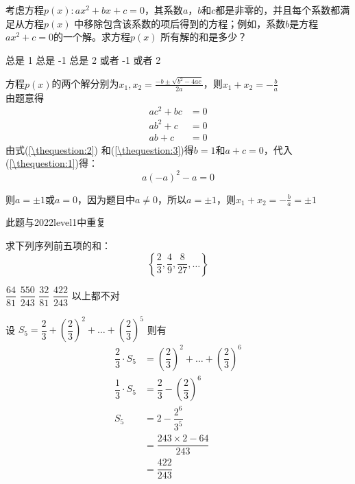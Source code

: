 \documentclass[answers]{exam}
\begin{document}
\begin{questions}
	\question 考虑方程$p(x): ax^2 + bx + c=0$，其系数$a$，$b$和$c$都是非零的，并且每个系数都满足从方程$p(x)$
	中移除包含该系数的项后得到的方程；例如，系数$b$是方程 $ax^2+c=0$的一个解。求方程$p(x)$
	所有解的和是多少？

	\begin{oneparchoices}
		\choice 总是 1 \choice 总是 -1 \choice 总是 2  或者 -1  或者 2
	\end{oneparchoices}
	\begin{solution}
		方程$p(x)$的两个解分别为$\displaystyle x_1, x_2 = \frac{-b \pm \sqrt{b^2 - 4ac}}{2a}$，则$\displaystyle x_1 +
			x_2 = -\frac{b}{a}$\\
		由题意得
		\begin{align}
			ac^2  + bc & = 0 \label{\thequestion:1} \\
			ab^2  + c  & = 0 \label{\thequestion:2} \\
			ab    + c  & = 0 \label{\thequestion:3}
		\end{align}
		由式(\ref{\thequestion:2}) 和(\ref{\thequestion:3})得$b=1$和$a+c=0$，代入(\ref{\thequestion:1})得：
		\begin{equation}
			a(-a)^2 -a  = 0
		\end{equation}

		则$a=\pm 1$或$a=0$，因为题目中$a \ne 0$，所以$a=\pm 1$，则$\displaystyle x_1 + x_2 = -\frac{b}{a}=\pm 1$

		此题与2022level1中重复
	\end{solution}

	\question 求下列序列前五项的和：
	\begin{equation*}
		\left\{ \dfrac{2}{3}, \dfrac{4}{9}, \dfrac{8}{27}, \dots\right\}
	\end{equation*}

	\begin{oneparchoices}
		\choice \( \dfrac{64}{81} \)
		\choice \( \dfrac{550}{243} \)
		\choice \( \dfrac{32}{81} \)
		\CorrectChoice \( \dfrac{422}{243} \)
		\choice 以上都不对
	\end{oneparchoices}

	\begin{solution}
		设 \( S_5 = \dfrac{2}{3} + \left(\dfrac{2}{3}\right)^2 + \dots + \left(\dfrac{2}{3}\right)^5\)
		则有
		\begin{align*}
			\dfrac{2}{3}\cdot S_5 & = \left(\dfrac{2}{3}\right)^2 + \dots + \left(\dfrac{2}{3}\right)^6 \\
			\dfrac{1}{3}\cdot S_5 & = \dfrac{2}{3} - \left(\dfrac{2}{3}\right)^6                        \\
			S_5                   & = 2 - \dfrac{2^6}{3^5}                                              \\
			                      & = \dfrac{243 \times 2 - 64}{243}                                    \\
			                      & = \dfrac{422}{243}
		\end{align*}
	\end{solution}


\end{questions}
\end{document}
